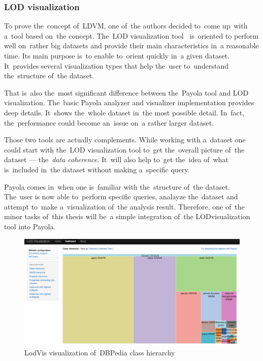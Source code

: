 \subsubsection{LOD visualization}
\label{rw:lodvis}
To prove the~concept of~LDVM, one of~the authors decided to~come up~with a~tool 
based on~the concept. The~LOD visualization tool~\cite{lodvis} is~oriented
to perform well on~rather big datasets and 
provide their main characteristics in~a reasonable time. Its main purpose is~to 
enable to~orient quickly in~a given dataset. It~provides several 
visualization types that help the~user to~understand the~structure of~the 
dataset.

That is~also the~most significant difference between the~Payola tool and LOD 
visualization. The~basic Payola analyzer and visualizer implementation provides 
deep details. It~shows the~whole dataset in~the most possible detail. In~fact, 
the~performance could become an~issue on~a rather larger dataset.

Those two tools are actually complements. While working with a~dataset one could 
start with the~LOD visualization tool to~get the~overall picture of~the dataset --- 
the~\emph{data coherence}. It~will also help to~get the~idea of~what is~included in~the 
dataset without making a~specific query.

Payola comes in~when one is~familiar with the~structure of~the dataset. The~user 
is now able to~perform specific queries, analayze the~dataset and attempt to~make a~visualization of~the analysis result. Therefore, one of~the minor tasks of~this thesis
will be~a simple integration of~the LODvisualization tool into Payola.

\begin{figure}
	\centering
	\includegraphics[width=140mm]{img/lodvis.png}
	\caption{LodVis visualization of~DBPedia class hierarchy}
	\label{fig:lodvis}
\end{figure}

